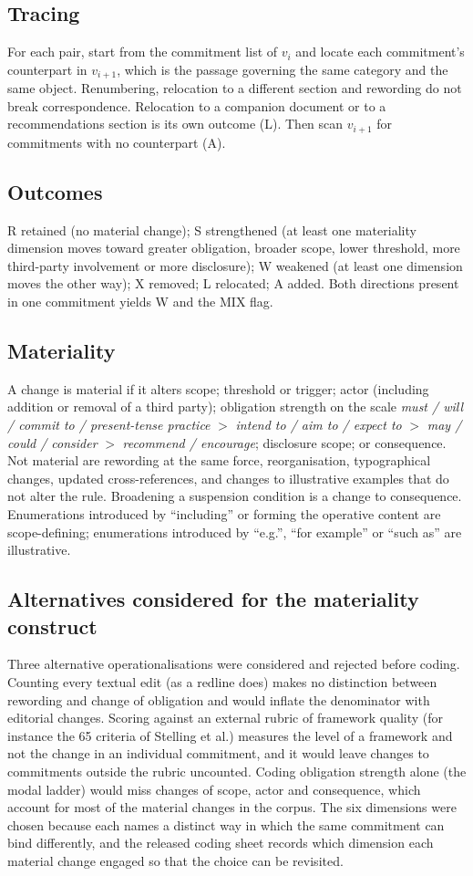 \documentclass{article}
\begin{document}
\subsection{Tracing}
For each pair, start from the commitment list of $v_i$ and locate each commitment's counterpart in $v_{i+1}$, which is the passage governing the same category and the same object. Renumbering, relocation to a different section and rewording do not break correspondence. Relocation to a companion document or to a recommendations section is its own outcome (L). Then scan $v_{i+1}$ for commitments with no counterpart (A).
\subsection{Outcomes}
R retained (no material change); S strengthened (at least one materiality dimension moves toward greater obligation, broader scope, lower threshold, more third-party involvement or more disclosure); W weakened (at least one dimension moves the other way); X removed; L relocated; A added. Both directions present in one commitment yields W and the MIX flag.
\subsection{Materiality}
A change is material if it alters scope; threshold or trigger; actor (including addition or removal of a third party); obligation strength on the scale \emph{must / will / commit to / present-tense practice} $>$ \emph{intend to / aim to / expect to} $>$ \emph{may / could / consider} $>$ \emph{recommend / encourage}; disclosure scope; or consequence. Not material are rewording at the same force, reorganisation, typographical changes, updated cross-references, and changes to illustrative examples that do not alter the rule. Broadening a suspension condition is a change to consequence. Enumerations introduced by ``including'' or forming the operative content are scope-defining; enumerations introduced by ``e.g.'', ``for example'' or ``such as'' are illustrative.
\subsection{Alternatives considered for the materiality construct}
Three alternative operationalisations were considered and rejected before coding. Counting every textual edit (as a redline does) makes no distinction between rewording and change of obligation and would inflate the denominator with editorial changes. Scoring against an external rubric of framework quality (for instance the 65 criteria of Stelling et al.) measures the level of a framework and not the change in an individual commitment, and it would leave changes to commitments outside the rubric uncounted. Coding obligation strength alone (the modal ladder) would miss changes of scope, actor and consequence, which account for most of the material changes in the corpus. The six dimensions were chosen because each names a distinct way in which the same commitment can bind differently, and the released coding sheet records which dimension each material change engaged so that the choice can be revisited.
\end{document}
